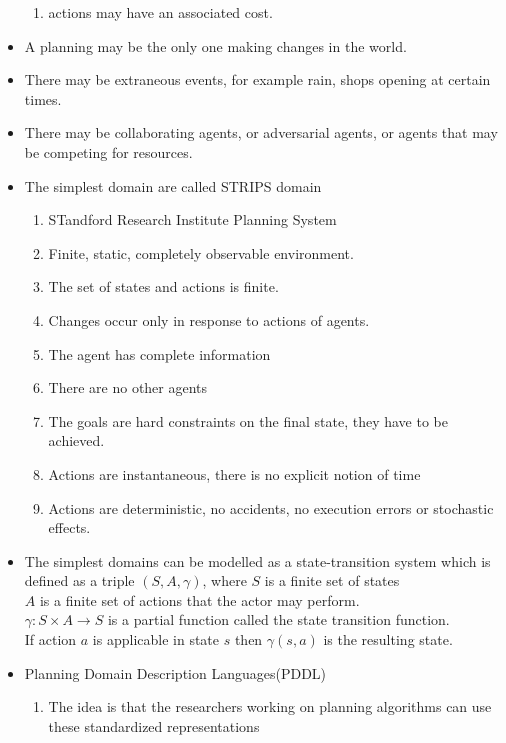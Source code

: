 \documentclass[a4paper]{article}
\begin{document}
\begin{itemize}
\begin{enumerate}
        \item actions may have an associated cost.
    \end{enumerate}
    \item A planning may be the only one making changes in the world.
    \item There may be extraneous events, for example rain, shops opening at certain times.
    \item There may be collaborating agents, or adversarial agents, or agents that may be competing for resources.
    \item The simplest domain are called STRIPS domain
    \begin{enumerate}
        \item STandford Research Institute Planning System
        \item Finite, static, completely observable environment.
        \item The set of states and actions is finite.
        \item Changes occur only in response to actions of agents.
        \item The agent has complete information
        \item There are no other agents
        \item The goals are hard constraints on the final state, they have to be achieved.
        \item Actions are instantaneous, there is no explicit notion of time
        \item Actions are deterministic, no accidents, no execution errors or stochastic effects.
    \end{enumerate}
    \item The simplest domains can be modelled as a state-transition system which is defined as a triple $(S,A,\gamma)$, where $S$ is a finite set of states\\
    $A$ is a finite set of actions that the actor may perform.\\
    $\gamma:S\times A\to S$ is a partial function called the state transition function.\\
    If action $a$ is applicable in state $s$ then $\gamma(s,a)$ is the resulting state.
    \item Planning Domain Description Languages(PDDL)
    \begin{enumerate}
        \item The idea is that the researchers working on planning algorithms can use these standardized representations

\end{enumerate}
\end{itemize}
\end{document}

